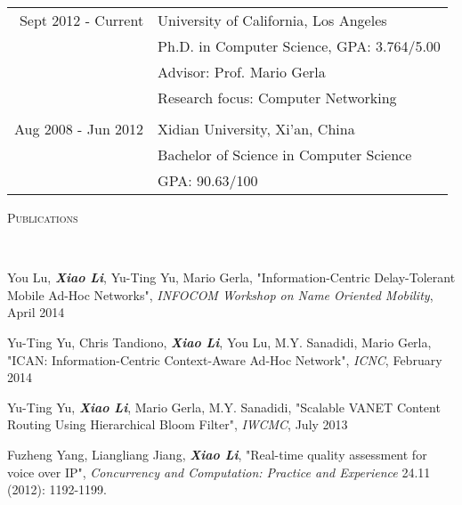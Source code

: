 \documentclass[12pt]{article}
\newenvironment{changemargin}[2]{%
  \begin{list}{}{%
    \setlength{\topsep}{0pt}%
    \setlength{\leftmargin}{#1}%
    \setlength{\rightmargin}{#2}%
    \setlength{\listparindent}{\parindent}%
    \setlength{\itemindent}{\parindent}%
    \setlength{\parsep}{\parskip}%
  }%
  \item[]}{\end{list}
  }
\newcommand{\lineover}{
  \begin{changemargin}{-0.05in}{-0.05in}
  \vspace*{-8pt}
  \hrulefill \\
  \vspace*{-2pt}
  \end{changemargin}
  }
\newcommand{\header}[1]{
  \begin{changemargin}{-0.5in}{-0.5in}
  \scshape{#1}\\
  \lineover
  \end{changemargin}
  }
\newenvironment{body} {
  \vspace*{-16pt}
  \begin{changemargin}{-0.25in}{-0.5in}
  }
  {\end{changemargin}
  }
\begin{document}
\begin{body}
  \vspace{16pt}
  \begin{tabular}{r | l}
    Sept 2012 - Current & University of California, Los Angeles \\
    & Ph.D. in Computer Science, GPA:  3.764/5.00\\
    & Advisor: Prof. Mario Gerla \\
    & Research focus: Computer Networking \\
    \multicolumn{2}{c}{} \\
    Aug 2008 - Jun 2012 & Xidian University, Xi'an, China \\
    & Bachelor of Science in Computer Science \\
    & GPA:  90.63/100
  \end{tabular}
\end{body}

\smallskip


\header{Publications}
\begin{body}
\vspace{14pt}
  \begin{enumerate}[leftmargin=0.25in,label={[\arabic*]}]
    \item
    You Lu, \textbf{\emph{Xiao Li}}, Yu-Ting Yu, Mario Gerla,
    "Information-Centric Delay-Tolerant Mobile Ad-Hoc Networks",
    \emph{INFOCOM Workshop on Name Oriented Mobility}, April 2014
    \item
    Yu-Ting Yu, Chris Tandiono, \textbf{\emph{Xiao Li}}, You Lu,
    M.Y. Sanadidi, Mario Gerla, "ICAN: Information-Centric Context-Aware
    Ad-Hoc Network", \emph{ICNC}, February 2014
    \item
    Yu-Ting Yu, \textbf{\emph{Xiao Li}}, Mario Gerla, M.Y. Sanadidi,
    "Scalable VANET Content Routing Using Hierarchical Bloom Filter",
    \emph{IWCMC}, July 2013
    \item
    Fuzheng Yang, Liangliang Jiang, \textbf{\emph{Xiao Li}}, "Real-time quality assessment for voice over IP", \emph{Concurrency and Computation: Practice and Experience} 24.11 (2012): 1192-1199.
  \end{enumerate}
\end{body}
\end{document}
